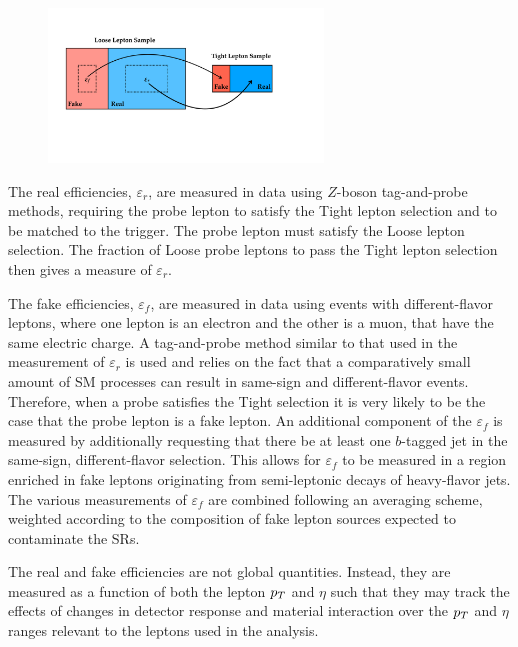 \begin{figure}[!htb]
    \begin{center}
        \includegraphics[width=0.65\textwidth]{figures/common_ana/fakes/fake_effs_illustration}
        \caption{
        }
        \label{fig:fake_effs}
    \end{center}
\end{figure}

The real efficiencies, $\varepsilon_r$, are measured in data using $Z$-boson tag-and-probe methods, requiring the probe lepton
to satisfy the Tight lepton selection and to be matched to the trigger.
The probe lepton must satisfy the Loose lepton selection.
The fraction of Loose probe leptons to pass the Tight lepton selection then gives a measure of $\varepsilon_r$.

The fake efficiencies, $\varepsilon_f$, are measured in data using events with different-flavor leptons,
where one lepton is an electron and the other is a muon, that have the same electric charge.
A tag-and-probe method similar to that used in the measurement of $\varepsilon_r$ is used
and relies on the fact that a comparatively small amount of SM processes can result in same-sign
and different-flavor events.
Therefore, when a probe satisfies the Tight selection it is very likely to be the case that the
probe lepton is a fake lepton.
An additional component of the $\varepsilon_f$ is measured by additionally requesting that there
be at least one $b$-tagged jet in the same-sign, different-flavor selection.
This allows for $\varepsilon_f$ to be measured in a region enriched in fake leptons originating
from semi-leptonic decays of heavy-flavor jets.
The various measurements of $\varepsilon_f$ are combined following an averaging scheme, weighted according
to the composition of fake lepton sources expected to contaminate the SRs.

The real and fake efficiencies are not global quantities.
Instead, they are measured as a function of both the lepton $p_{T}$ and $\eta$
such that they may track the effects of changes in detector response and
material interaction over the $p_{T}$ and $\eta$ ranges relevant to the leptons used in the analysis.

